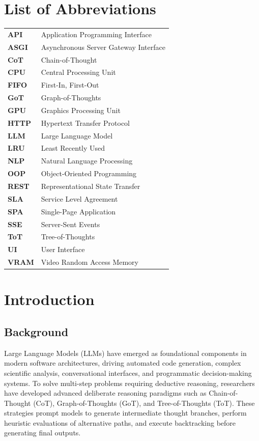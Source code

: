 \documentclass[12pt,a4paper]{report}
\begin{document}
\chapter*{List of Abbreviations}
\begin{tabular}{@{}ll@{}}
\textbf{API} & Application Programming Interface \\
\textbf{ASGI} & Asynchronous Server Gateway Interface \\
\textbf{CoT} & Chain-of-Thought \\
\textbf{CPU} & Central Processing Unit \\
\textbf{FIFO} & First-In, First-Out \\
\textbf{GoT} & Graph-of-Thoughts \\
\textbf{GPU} & Graphics Processing Unit \\
\textbf{HTTP} & Hypertext Transfer Protocol \\
\textbf{LLM} & Large Language Model \\
\textbf{LRU} & Least Recently Used \\
\textbf{NLP} & Natural Language Processing \\
\textbf{OOP} & Object-Oriented Programming \\
\textbf{REST} & Representational State Transfer \\
\textbf{SLA} & Service Level Agreement \\
\textbf{SPA} & Single-Page Application \\
\textbf{SSE} & Server-Sent Events \\
\textbf{ToT} & Tree-of-Thoughts \\
\textbf{UI} & User Interface \\
\textbf{VRAM} & Video Random Access Memory
\end{tabular}

\newpage
{}
\setcounter{page}{1}

\chapter{Introduction}
\label{ch:intro}

\section{Background}
\label{sec:background}
Large Language Models (LLMs) have emerged as foundational components in modern software architectures, driving automated code generation, complex scientific analysis, conversational interfaces, and programmatic decision-making systems. To solve multi-step problems requiring deductive reasoning, researchers have developed advanced deliberate reasoning paradigms such as Chain-of-Thought (CoT), Graph-of-Thoughts (GoT), and Tree-of-Thoughts (ToT). These strategies prompt models to generate intermediate thought branches, perform heuristic evaluations of alternative paths, and execute backtracking before generating final outputs.
\end{document}
